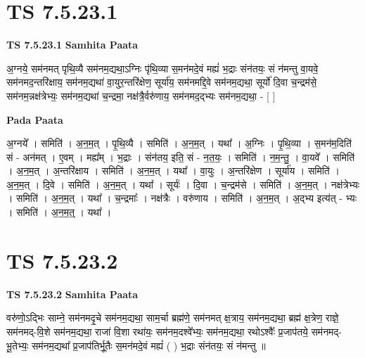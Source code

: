 \documentclass[17pt]{extarticle}
\begin{document}

\section{ TS 7.5.23.1 }

\textbf{TS 7.5.23.1 } \newline
\textbf{Samhita Paata} \newline

अ॒ग्नये॒ सम॑नमत् पृथि॒व्यै सम॑नम॒द्यथा॒ऽग्निः पृ॑थि॒व्या स॒मन॑मदे॒वं मह्यं॑ भ॒द्राः संन॑तयः॒ सं न॑मन्तु वा॒यवे॒ सम॑नमद॒न्तरि॑क्षाय॒ सम॑नम॒द्यथा॑ वा॒युर॒न्तरि॑क्षेण॒ सूर्या॑य॒ सम॑नमद्दि॒वे सम॑नम॒द्यथा॒ सूर्यो॑ दि॒वा च॒न्द्रम॑से॒ सम॑नम॒न्नक्ष॑त्रेभ्यः॒ सम॑नम॒द्यथा॑ च॒न्द्रमा॒ नक्ष॑त्रै॒र्वरु॑णाय॒ सम॑नमद॒द्भ्यः सम॑नम॒द्यथा॒ - [  ] \newline

\textbf{Pada Paata} \newline

अ॒ग्नये᳚ । समिति॑ । अ॒न॒म॒त् । पृ॒थि॒व्यै । समिति॑ । अ॒न॒म॒त् । यथा᳚ । अ॒ग्निः । पृ॒थि॒व्या । स॒मन॑म॒दिति॑ सं - अन॑मत् । ए॒वम् । मह्य᳚म् । भ॒द्राः । संन॑तय॒ इति॒ सं - न॒त॒यः॒ । समिति॑ । न॒म॒न्तु॒ । वा॒यवे᳚ । समिति॑ । अ॒न॒म॒त् । अ॒न्तरि॑क्षाय । समिति॑ । अ॒न॒म॒त् । यथा᳚ । वा॒युः । अ॒न्तरि॑क्षेण । सूर्या॑य । समिति॑ । अ॒न॒म॒त् । दि॒वे । समिति॑ । अ॒न॒म॒त् । यथा᳚ । सूर्यः॑ । दि॒वा । च॒न्द्रम॑से । समिति॑ । अ॒न॒म॒त् । नक्ष॑त्रेभ्यः । समिति॑ । अ॒न॒म॒त् । यथा᳚ । च॒न्द्रमाः᳚ । नक्ष॑त्रैः । वरु॑णाय । समिति॑ । अ॒न॒म॒त् । अ॒द्भ्य इत्य॑त् - भ्यः । समिति॑ । अ॒न॒म॒त्॒ । यथा᳚ ।  \newline





\section{ TS 7.5.23.2 }

\textbf{TS 7.5.23.2 } \newline
\textbf{Samhita Paata} \newline

वरु॑णो॒ऽद्भिः साम्ने॒ सम॑नमदृ॒चे सम॑नम॒द्यथा॒ साम॒र्चा ब्रह्म॑णे॒ सम॑नमत् क्ष॒त्राय॒ सम॑नम॒द्यथा॒ ब्रह्म॑ क्ष॒त्रेण॒ राज्ञे॒ सम॑नमद्-वि॒शे सम॑नम॒द्यथा॒ राजा॑ वि॒शा रथा॑यः॒ सम॑नम॒दश्वे᳚भ्यः॒ सम॑नम॒द्यथा॒ रथोऽश्वैः᳚ प्र॒जाप॑तये॒ सम॑नमद्-भू॒तेभ्यः॒ सम॑नम॒द्यथा᳚ प्र॒जाप॑तिर्भू॒तैः स॒मन॑मदे॒वं मह्यं॑ ( ) भ॒द्राः संन॑तयः॒ सं न॑मन्तु ॥ \newline
\end{document}
